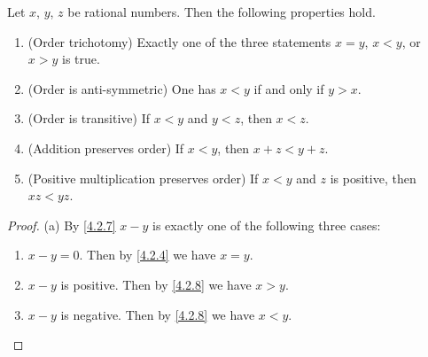 \begin{prop}\label{4.2.9}
  Let \(x\), \(y\), \(z\) be rational numbers.
  Then the following properties hold.
  \begin{enumerate}
    \item (Order trichotomy)
          Exactly one of the three statements \(x = y\), \(x < y\), or \(x > y\) is true.
    \item (Order is anti-symmetric)
          One has \(x < y\) if and only if \(y > x\).
    \item (Order is transitive)
          If \(x < y\) and \(y < z\), then \(x < z\).
    \item (Addition preserves order)
          If \(x < y\), then \(x + z < y + z\).
    \item (Positive multiplication preserves order)
          If \(x < y\) and \(z\) is positive, then \(xz < yz\).
  \end{enumerate}
\end{prop}

\begin{proof}{(a)}
  By \cref{4.2.7} \(x - y\) is exactly one of the following three cases:
  \begin{enumerate}[label=(\Roman*)]
    \item \(x - y = 0\).
          Then by \cref{4.2.4} we have \(x = y\).
    \item \(x - y\) is positive.
          Then by \cref{4.2.8} we have \(x > y\).
    \item \(x - y\) is negative.
          Then by \cref{4.2.8} we have \(x < y\).
  \end{enumerate}
\end{proof}

